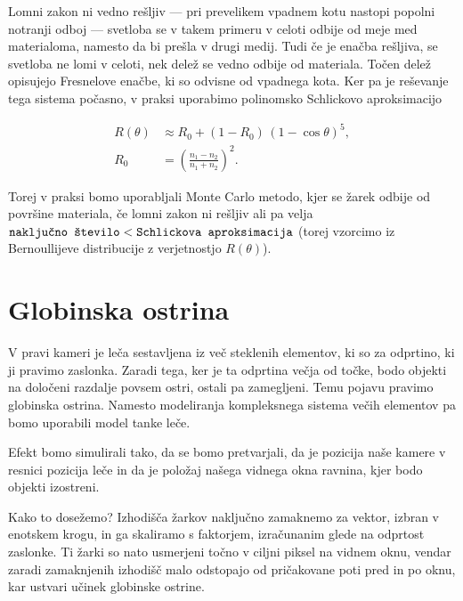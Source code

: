 \documentclass[12pt, a4paper]{article}
\begin{document}

Lomni zakon ni vedno rešljiv — pri prevelikem vpadnem kotu nastopi popolni notranji odboj — svetloba se v takem
primeru v celoti odbije od meje med materialoma, namesto da bi prešla v drugi medij. Tudi če je enačba rešljiva,
se svetloba ne lomi v celoti, nek delež se vedno odbije od materiala. Točen delež opisujejo Fresnelove enačbe, ki
so odvisne od vpadnega kota. Ker pa je reševanje tega sistema počasno, v praksi uporabimo polinomsko Schlickovo
aproksimacijo

$$
	\begin{aligned}
		R(\theta) & \approx R_0 + (1 - R_0)\,(1 - \cos\theta)^5,  \\
		R_0       & = \left(\frac{n_1 - n_2}{n_1 + n_2}\right)^2.
	\end{aligned}
$$

Torej v praksi bomo uporabljali Monte Carlo metodo, kjer se žarek odbije od površine materiala, če lomni zakon
ni rešljiv ali pa velja $\verb|naključno število| < \verb|Schlickova aproksimacija|$ (torej vzorcimo
iz Bernoullijeve distribucije z verjetnostjo $R(\theta)$).

\section{Globinska ostrina}

V pravi kameri je leča sestavljena iz več steklenih elementov, ki so za odprtino, ki ji pravimo zaslonka.
Zaradi tega, ker je ta odprtina večja od točke, bodo objekti na določeni razdalje povsem ostri, ostali pa
zamegljeni. Temu pojavu pravimo globinska ostrina. Namesto modeliranja kompleksnega sistema večih elementov
pa bomo uporabili model tanke leče.


Efekt bomo simulirali tako, da se bomo pretvarjali, da je pozicija naše kamere v resnici pozicija leče in
da je položaj našega vidnega okna ravnina, kjer bodo objekti izostreni.

Kako to dosežemo? Izhodišča žarkov naključno zamaknemo za vektor, izbran v enotskem krogu, in ga skaliramo s
faktorjem, izračunanim glede na odprtost zaslonke. Ti žarki so nato usmerjeni točno v ciljni piksel na vidnem
oknu, vendar zaradi zamaknjenih izhodišč malo odstopajo od pričakovane poti pred in po oknu, kar ustvari učinek
globinske ostrine.

\printbibliography
\end{document}
